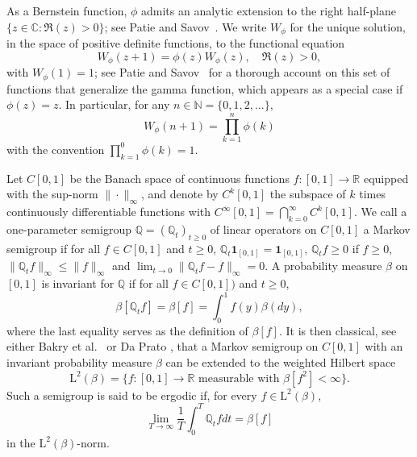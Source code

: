 \documentclass[10pt]{amsart}
\let\ra\rightarrow
\theoremstyle{plain}
\theoremstyle{definition}
\newcommand{\N}{\mathbb{N}}
\newcommand{\R}{\mathbb{R}}
\newcommand{\J}{\mathds{Q}}
\newcommand{\Leb}{\mathrm{L}}
\let\bpsi\beta
\begin{document}
As a Bernstein function, $\phi$ admits an analytic extension to the right half-plane $\{z \in \mathbb{C} : \Re(z)\!>\!0\}$; see \eg Patie and Savov~\cite[Chap.\,4]{Patie-Savov-GeL}. We write $W_{\phi}$ for the unique solution, in the space of positive definite functions, to the functional equation
\begin{equation*}
W_{\phi}(z+1)=\phi(z)W_{\phi}(z), \quad \Re(z)>0,
\end{equation*}
with $W_{\phi}(1)=1$; see Patie and Savov~\cite{Patie-Savov-Bern} for a thorough account on this set of functions that generalize the gamma function, which appears as a special case if $\phi(z)=z$. In particular, for any
$n\in \N = \{0,1,2, \dots\}$,
\begin{equation}
\label{eq:product-Wphi}
W_{\phi}(n+1)=\prod_{k=1}^n \phi(k)
\end{equation}
with the convention $\prod_{k=1}^0 \phi(k) = 1$.

Let $C[0,1]$ be the Banach space of continuous functions $f \colon [0,1] \to \R$ equipped with the
sup-norm $\| {\cdot} \|_\infty$, and denote by $C^k[0,1]$ the subspace of $k$ times continuously
differentiable functions with $C^\infty[0,1] = \bigcap_{k=0}^\infty C^k[0,1]$. We call a one-parameter semigroup
$\J = (\J_t)_{t \geq 0}$ of linear operators on $C[0,1]$ a Markov semigroup if for all $f \in C[0,1]$ and $t \ge 0$,
$\J_t \bm{1}_{[0,1]} = \bm{1}_{[0,1]}$, $\J_t f \geq 0$ if $f \geq 0$, $\|\J_t f\|_\infty \leq \|f\|_\infty$
and $\lim_{t\to 0} \|\J_t f - f\|_\infty = 0$. A probability measure $\bpsi$ on $[0,1]$ is invariant for $\J$ if for all $f \in C[0,1])$ and $t \ge 0$,
\begin{equation*}
\bpsi [ \J_t f ] = \bpsi[f] =\int_0^1 f(y)\bpsi(dy),
\end{equation*}
where the last equality serves as the definition of $\bpsi[f]$. It is then classical, see either Bakry et al.~\cite{Bakry_Book} or Da Prato \cite{da-prato:2006}, that a Markov semigroup on $C[0,1]$ with an invariant probability measure $\bpsi$
can be extended to the weighted Hilbert space
\begin{equation*}
\Leb^2(\bpsi) =\lbrace f \colon [0,1] \ra \R \textrm{ measurable with } \bpsi[f^2] <\infty\rbrace.
\end{equation*}
Such a semigroup is said to be ergodic if, for every $f \in \Leb^2(\bpsi)$,\vspace*{-3pt}
\[
\lim_{T \to \infty} \frac{1}{T} \int_0^T \J_t f dt = \bpsi[f]
\]
in the $\Leb^2(\bpsi)$-norm.
\end{document}
